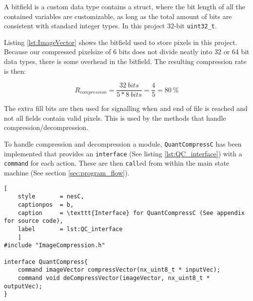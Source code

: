 A bitfield is a custom data type contains a struct, where the bit length of all the contained variables are customizable, as long as the total amount of bits are consistent with standard integer types.
In this project 32-bit \texttt{uint32\_t}.

Listing \ref{lst:ImageVector} shows the bitfield used to store pixels in this project.
Because our compressed pixelsize of 6 bits does not divide neatly into 32 or 64 bit data types, there is some overhead in the bitfield.
The resulting compression rate is then:

\begin{equation}
R_{compression} = 
\dfrac{32\ bits}
{5 * 8\ bits} =
\dfrac{4}{5} = 
80\ \%
\end{equation}

The extra fill bits are then used for signalling when and end of file is reached and not all fields contain valid pixels.
This is used by the methods that handle compression/decompression. 

To handle compression and decompression a module, \texttt{QuantCompressC} has been implemented that provides an \texttt{interface} (See listing \ref{lst:QC_interface}) with a \texttt{command} for each action.
These are then \texttt{call}ed from within the main state machine (See section \ref{sec:program_flow}).

\begin{lstlisting}[
	style		= nesC, 
	captionpos	= b, 
	caption		= \texttt{Interface} for QuantCompressC (See appendix for source code),
	label		= lst:QC_interface
	]
#include "ImageCompression.h"

interface QuantCompress{
	command imageVector compressVector(nx_uint8_t * inputVec);
	command void deCompressVector(imageVector, nx_uint8_t * outputVec);
}
\end{lstlisting}
